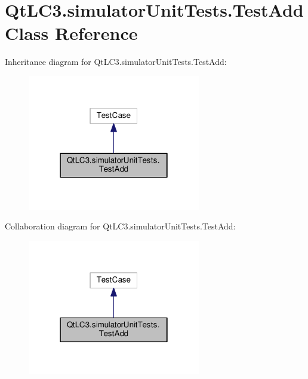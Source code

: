 \hypertarget{class_qt_l_c3_1_1simulator_unit_tests_1_1_test_add}{\section{Qt\-L\-C3.\-simulator\-Unit\-Tests.\-Test\-Add Class Reference}
\label{class_qt_l_c3_1_1simulator_unit_tests_1_1_test_add}
}


Inheritance diagram for Qt\-L\-C3.\-simulator\-Unit\-Tests.\-Test\-Add\-:
\nopagebreak
\begin{figure}[H]
\begin{center}
\leavevmode
\includegraphics[width=214pt]{class_qt_l_c3_1_1simulator_unit_tests_1_1_test_add__inherit__graph}
\end{center}
\end{figure}


Collaboration diagram for Qt\-L\-C3.\-simulator\-Unit\-Tests.\-Test\-Add\-:
\nopagebreak
\begin{figure}[H]
\begin{center}
\leavevmode
\includegraphics[width=214pt]{class_qt_l_c3_1_1simulator_unit_tests_1_1_test_add__coll__graph}
\end{center}
\end{figure}
